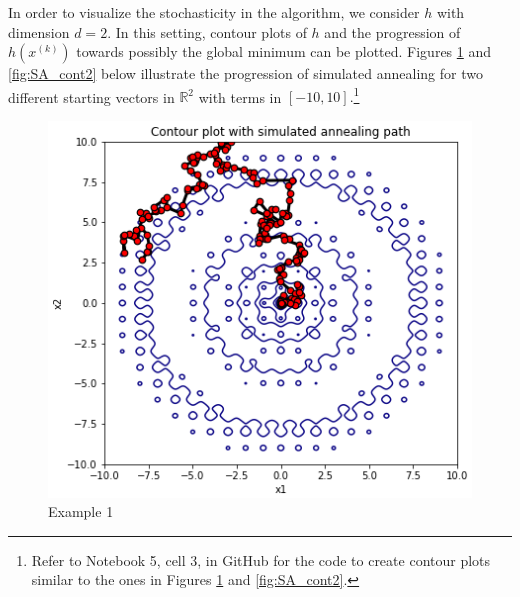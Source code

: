 In order to visualize the stochasticity in the algorithm, we consider $h$ with dimension $d=2.$ In this setting, contour plots of $h$ and the progression of $h(x^{(k)})$ towards possibly the global minimum can be plotted. Figures \ref{fig:SA_cont1} and \ref{fig:SA_cont2} below illustrate the progression of simulated annealing for two different starting vectors in $\mathbb{R}^2$ with terms in $\left[-10, 10\right].$\footnote{Refer to Notebook 5, cell 3, in GitHub \cite{ThesisCode2023} for the code to create contour plots similar to the ones in Figures \ref{fig:SA_cont1} and \ref{fig:SA_cont2}.}
\begin{figure}[h]
    \centering
    \begin{minipage}[b][0.36\textwidth]{0.34\textwidth}
      \includegraphics[width=\textwidth]{Pictures/sa_convergence-ackley_contour11.png}
      \caption{Example 1}\label{fig:SA_cont1}
    \end{minipage}
    \hspace{0.05cm}
    \begin{minipage}[b][0.36\textwidth]{0.34\textwidth}

\end{minipage}
\end{figure}
